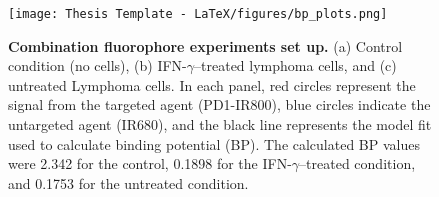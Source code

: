 \begin{figure}[H]
    \centering
    \begin{minipage}{1\linewidth}
        \texttt{[image: Thesis Template - LaTeX/figures/bp\_plots.png]}
        \captionsetup{justification=raggedright, singlelinecheck=false}
        \caption[Binding potential fits]{
            \textbf{Combination fluorophore experiments set up.} 
            (a) Control condition (no cells), (b) IFN-$\gamma$–treated lymphoma cells, and (c) untreated  Lymphoma cells. In each panel, red circles represent the signal from the targeted agent (PD1-IR800), blue circles indicate the untargeted agent (IR680), and the black line represents the model fit used to calculate binding potential (BP). The calculated BP values were 2.342 for the control, 0.1898 for the IFN-$\gamma$–treated condition, and 0.1753 for the untreated condition.
        }
        \label{fig:bp_plots}
    \end{minipage}
\end{figure}
